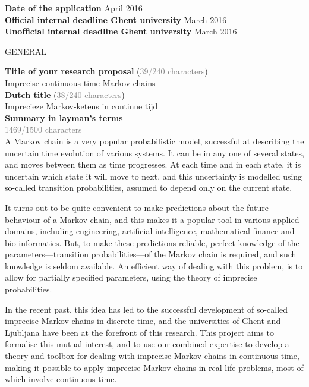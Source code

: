 \documentclass[11pt,dvipsnames,usenames,a4paper]{article}
\begin{document}
\newcommand{\todo}[1]{\textcolor{red}{\emph{#1}}}


{\bf Date of the application} \tab{} April 2016 \\
{\bf Official internal deadline Ghent university}  March 2016 \\
{\bf Unofficial internal deadline Ghent university}  March 2016 \\


\begin{shaded}\centering GENERAL \end{shaded}
\textbf{Title of your research proposal} (\textcolor{Gray}{39/240 characters})\\
Imprecise continuous-time Markov chains\\[8pt]
\textbf{Dutch title} (\textcolor{Gray}{38/240 characters})\\
Imprecieze Markov-ketens in continue tijd\\[8pt]
\textbf{Summary in layman's terms}\\
\textcolor{Gray}{1469/1500 characters}\\
A Markov chain is a very popular probabilistic model, successful at describing the uncertain time evolution of various systems. 
It can be in any one of several states, and moves between them as time progresses. 
At each time and in each state, it is uncertain which state it will move to next, and this uncertainty is modelled using so-called transition probabilities, assumed to depend only on the current state. 

It turns out to be quite convenient to make predictions about the future behaviour of a Markov chain, and this makes it a popular tool in various applied domains, including engineering, artificial intelligence, mathematical finance and bio-informatics. 
But, to make these predictions reliable, perfect knowledge of the parameters---transition probabilities---of the Markov chain is required, and such knowledge is seldom available. 
An efficient way of dealing with this problem, is to allow for partially specified parameters, using the theory of imprecise probabilities.

In the recent past, this idea has led to the successful development of so-called imprecise Markov chains in discrete time, and the universities of Ghent and Ljubljana have been at the forefront of this research. 
This project aims to formalise this mutual interest, and to use our combined expertise to develop a theory and toolbox for dealing with imprecise Markov chains in continuous time, making it possible to apply imprecise Markov chains in real-life problems, most of which involve continuous time.
\end{document}

